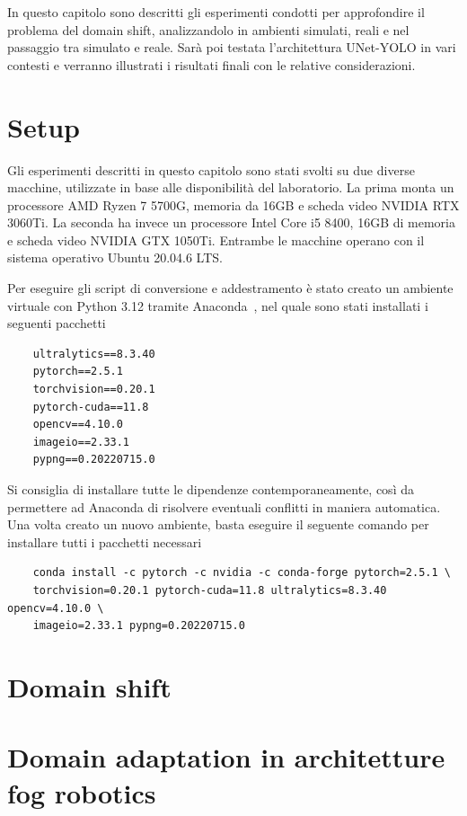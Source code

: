 \documentclass[12pt]{report}
\begin{document}
In questo capitolo sono descritti gli esperimenti condotti per approfondire il problema del domain shift, analizzandolo in ambienti simulati, reali e nel passaggio tra simulato e reale. Sarà poi testata l'architettura UNet-YOLO in vari contesti e verranno illustrati i risultati finali con le relative considerazioni.

\section{Setup}
\label{sec:setup}

Gli esperimenti descritti in questo capitolo sono stati svolti su due diverse macchine, utilizzate in base alle disponibilità del laboratorio. La prima monta un processore AMD Ryzen 7 5700G, memoria da 16GB e scheda video NVIDIA RTX 3060Ti. La seconda ha invece un processore Intel Core i5 8400, 16GB di memoria e scheda video NVIDIA GTX 1050Ti. Entrambe le macchine operano con il sistema operativo Ubuntu 20.04.6 LTS.

Per eseguire gli script di conversione e addestramento è stato creato un ambiente virtuale con Python 3.12 tramite Anaconda~\cite{anaconda}, nel quale sono stati installati i seguenti pacchetti

\begin{verbatim}
	ultralytics==8.3.40
	pytorch==2.5.1
	torchvision==0.20.1
	pytorch-cuda==11.8
	opencv==4.10.0
	imageio==2.33.1
	pypng==0.20220715.0
\end{verbatim}

Si consiglia di installare tutte le dipendenze contemporaneamente, così da permettere ad Anaconda di risolvere eventuali conflitti in maniera automatica. Una volta creato un nuovo ambiente, basta eseguire il seguente comando per installare tutti i pacchetti necessari

\begin{verbatim}
	conda install -c pytorch -c nvidia -c conda-forge pytorch=2.5.1 \
	torchvision=0.20.1 pytorch-cuda=11.8 ultralytics=8.3.40 opencv=4.10.0 \
	imageio=2.33.1 pypng=0.20220715.0
\end{verbatim}

\section{Domain shift}
\label{sec:domain_shift}

\section{Domain adaptation in architetture fog robotics}
\label{sec:domain_shift_in_contesto_fog_robotics}
\end{document}
